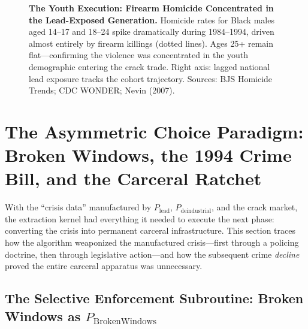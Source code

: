 \begin{figure}[htbp]
\caption[The Youth Execution]{\textbf{The Youth Execution: Firearm Homicide Concentrated in the Lead-Exposed Generation.} Homicide rates for Black males aged 14--17 and 18--24 spike dramatically during 1984--1994, driven almost entirely by firearm killings (dotted lines). Ages 25+ remain flat---confirming the violence was concentrated in the youth demographic entering the crack trade. Right axis: lagged national lead exposure tracks the cohort trajectory. Sources: BJS Homicide Trends; CDC WONDER; Nevin (2007).}
\label{fig:youth_homicide}
\end{figure}

\section{The Asymmetric Choice Paradigm: Broken Windows, the 1994 Crime Bill, and the Carceral Ratchet}

With the ``crisis data'' manufactured by $P_{\text{lead}}$, $P_{\text{deindustrial}}$, and the crack market, the extraction kernel had everything it needed to execute the next phase: converting the crisis into permanent carceral infrastructure. This section traces how the algorithm weaponized the manufactured crisis---first through a policing doctrine, then through legislative action---and how the subsequent crime \textit{decline} proved the entire carceral apparatus was unnecessary.

\subsection{The Selective Enforcement Subroutine: Broken Windows as \texorpdfstring{$P_{\text{BrokenWindows}}$}{P\_BrokenWindows}}

